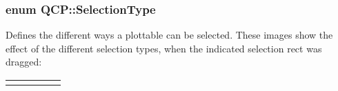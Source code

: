 \subsubsection[{\texorpdfstring{Selection\+Type}{SelectionType}}]{\setlength{\rightskip}{0pt plus 5cm}enum {\bf Q\+C\+P\+::\+Selection\+Type}}\hypertarget{namespace_q_c_p_ac6cb9db26a564b27feda362a438db038}{}\label{namespace_q_c_p_ac6cb9db26a564b27feda362a438db038}
Defines the different ways a plottable can be selected. These images show the effect of the different selection types, when the indicated selection rect was dragged\+:

\begin{center} \tabulinesep=1mm
\begin{longtabu} spread 0pt [c]{*5{|X[-1]}|}
\hline
 & & & &  \\
\end{longtabu}
\end{center} 

